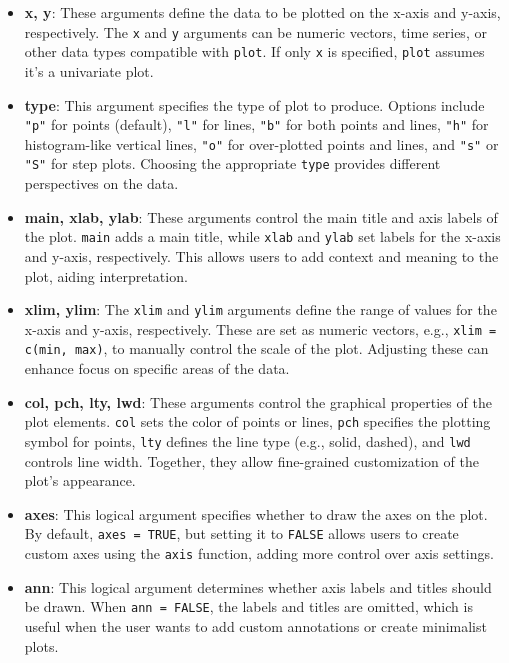 \documentclass[10pt]{book}
\begin{document}
\begin{itemize}
    \item \textbf{x, y}: These arguments define the data to be plotted on the x-axis and y-axis, respectively. The \texttt{x} and \texttt{y} arguments can be numeric vectors, time series, or other data types compatible with \texttt{plot}. If only \texttt{x} is specified, \texttt{plot} assumes it’s a univariate plot.

    \item \textbf{type}: This argument specifies the type of plot to produce. Options include \texttt{"p"} for points (default), \texttt{"l"} for lines, \texttt{"b"} for both points and lines, \texttt{"h"} for histogram-like vertical lines, \texttt{"o"} for over-plotted points and lines, and \texttt{"s"} or \texttt{"S"} for step plots. Choosing the appropriate \texttt{type} provides different perspectives on the data.

    \item \textbf{main, xlab, ylab}: These arguments control the main title and axis labels of the plot. \texttt{main} adds a main title, while \texttt{xlab} and \texttt{ylab} set labels for the x-axis and y-axis, respectively. This allows users to add context and meaning to the plot, aiding interpretation.

    \item \textbf{xlim, ylim}: The \texttt{xlim} and \texttt{ylim} arguments define the range of values for the x-axis and y-axis, respectively. These are set as numeric vectors, e.g., \texttt{xlim = c(min, max)}, to manually control the scale of the plot. Adjusting these can enhance focus on specific areas of the data.

    \item \textbf{col, pch, lty, lwd}: These arguments control the graphical properties of the plot elements. \texttt{col} sets the color of points or lines, \texttt{pch} specifies the plotting symbol for points, \texttt{lty} defines the line type (e.g., solid, dashed), and \texttt{lwd} controls line width. Together, they allow fine-grained customization of the plot's appearance.

    \item \textbf{axes}: This logical argument specifies whether to draw the axes on the plot. By default, \texttt{axes = TRUE}, but setting it to \texttt{FALSE} allows users to create custom axes using the \texttt{axis} function, adding more control over axis settings.

    \item \textbf{ann}: This logical argument determines whether axis labels and titles should be drawn. When \texttt{ann = FALSE}, the labels and titles are omitted, which is useful when the user wants to add custom annotations or create minimalist plots.


\end{itemize}
\end{document}
